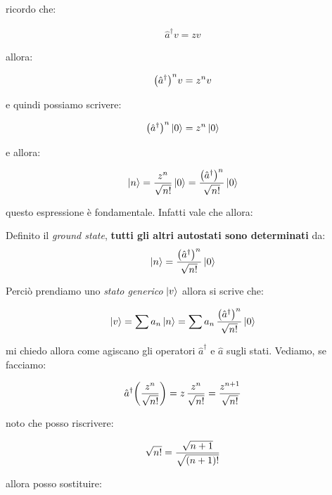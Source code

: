 	ricordo che:
	
\begin{align*}
	\hat{a}^{\dagger}v = z v
\end{align*}

	allora:
	
\begin{align*}
	\qty(\hat{a}^{\dagger})^n v = z^n v
\end{align*}

	e quindi possiamo scrivere:
	
\begin{align*}
	\qty(\hat{a}^{\dagger})^n \ket{0} = z^n \ket{0}
\end{align*}
	
	e allora:
	
\begin{align*}
	\ket{n} = \frac{z^n}{\sqrt{n!}}  \ket{0}   = \frac{\qty(\hat{a}^{\dagger})^n}{\sqrt{n!}}  \ket{0}  
\end{align*}

	questo espressione è fondamentale. Infatti vale che allora:
	
\begin{mydef}
	Definito il \textit{ground state}, \textbf{tutti gli altri autostati sono determinati} da:
\begin{align*}
	\ket{n} = \frac{\qty(\hat{a}^{\dagger})^n}{\sqrt{n!}} \ket{0}  
\end{align*}
\end{mydef}

	Perciò prendiamo uno \textit{stato generico} $\ket{v}$ allora si scrive che:
	
\begin{align*}
	\ket{v} = \sum a_n \ket{n} = \sum a_n \, \frac{\qty(\hat{a}^{\dagger})^n}{\sqrt{n!}} \ket{0}  
\end{align*}

	mi chiedo allora come agiscano gli operatori $\hat{a}^{\dagger}$ e $\hat{a}$ sugli stati. Vediamo, se facciamo:
	
\begin{align*}
	\hat{a}^{\dagger}\qty(\frac{z^n}{\sqrt{n!}}) = z \,\frac{z^n}{\sqrt{n!}} = \frac{z^{n+1}}{\sqrt{n!}} 
\end{align*}

	noto che posso riscrivere:
	
\begin{align*}
	\sqrt{n!}= \frac{\sqrt{n+1}}{\sqrt{\qty(n+1)!}}
\end{align*}

	allora posso sostituire:

